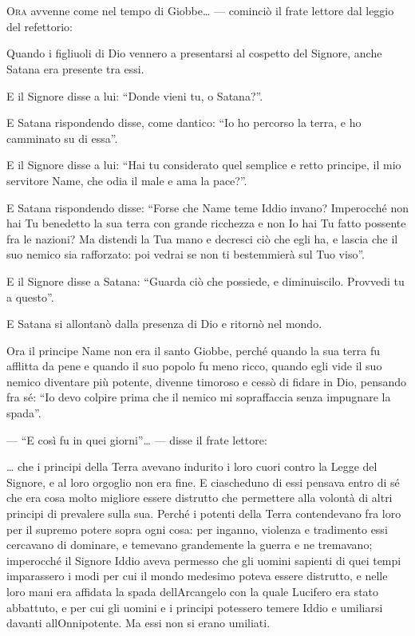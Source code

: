 	\chapter{\phantom{title}}

\lettrine{O}{ra} avvenne come nel tempo di Giobbe\ldots{} --- cominciò il frate
lettore dal leggio del refettorio:

Quando i figliuoli di Dio vennero a presentarsi al cospetto del Signore,
anche Satana era presente tra essi.

E il Signore disse a lui: ``Donde vieni tu, o Satana?''.

E Satana rispondendo disse, come d\textquotesingle antico: ``Io ho
percorso la terra, e ho camminato su di essa''.

E il Signore disse a lui: ``Hai tu considerato quel semplice e retto
principe, il mio servitore Name, che odia il male e ama la pace?''.

E Satana rispondendo disse: ``Forse che Name teme Iddio invano?
Imperocché non hai Tu benedetto la sua terra con grande ricchezza e non
Io hai Tu fatto possente fra le nazioni? Ma distendi la Tua mano e
decresci ciò che egli ha, e lascia che il suo nemico sia rafforzato: poi
vedrai se non ti bestemmierà sul Tuo viso''.

E il Signore disse a Satana: ``Guarda ciò che possiede, e diminuiscilo.
Provvedi tu a questo''.

E Satana si allontanò dalla presenza di Dio e ritornò nel mondo.

Ora il principe Name non era il santo Giobbe, perché quando la sua terra
fu afflitta da pene e quando il suo popolo fu meno ricco, quando egli
vide il suo nemico diventare più potente, divenne timoroso e cessò di
fidare in Dio, pensando fra sé: ``Io devo colpire prima che il nemico mi
sopraffaccia senza impugnare la spada''.

--- ``E così fu in quei giorni''\ldots{} --- disse il frate lettore:

\ldots{} che i principi della Terra avevano indurito i loro cuori contro
la Legge del Signore, e al loro orgoglio non era fine. E ciascheduno di
essi pensava entro di sé che era cosa molto migliore essere distrutto
che permettere alla volontà di altri principi di prevalere sulla sua.
Perché i potenti della Terra contendevano fra loro per il supremo potere
sopra ogni cosa: per inganno, violenza e tradimento essi cercavano di
dominare, e temevano grandemente la guerra e ne tremavano; imperocché il
Signore Iddio aveva permesso che gli uomini sapienti di quei tempi
imparassero i modi per cui il mondo medesimo poteva essere distrutto, e
nelle loro mani era affidata la spada dell\textquotesingle Arcangelo con
la quale Lucifero era stato abbattuto, e per cui gli uomini e i principi
potessero temere Iddio e umiliarsi davanti
all\textquotesingle Onnipotente. Ma essi non si erano umiliati.


